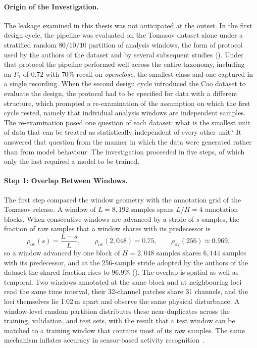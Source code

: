 \paragraph[Origin of the Investigation]{Origin of the Investigation.}
The leakage examined in this thesis was not anticipated at the outset. In the first design cycle, the pipeline was evaluated on the Tomasov dataset alone under a stratified random $80/10/10$ partition of analysis windows, the form of protocol used by the authors of the dataset and by several subsequent studies (). Under that protocol the pipeline performed well across the entire taxonomy, including an $F_1$ of $0.72$ with $70\%$ recall on \emph{openclose}, the smallest class and one captured in a single recording. When the second design cycle introduced the Cao dataset to evaluate the design, the protocol had to be specified for data with a different structure, which prompted a re-examination of the assumption on which the first cycle rested, namely that individual analysis windows are independent samples. The re-examination posed one question of each dataset: what is the smallest unit of data that can be treated as statistically independent of every other unit? It answered that question from the manner in which the data were generated rather than from model behaviour. The investigation proceeded in five steps, of which only the last required a model to be trained.

\paragraph[Step 1: Overlap Between Windows]{Step 1: Overlap Between Windows.}
The first step compared the window geometry with the annotation grid of the Tomasov release. A window of $L = 8{,}192$ samples spans $L/H = 4$ annotation blocks. When consecutive windows are advanced by a stride of $s$ samples, the fraction of raw samples that a window shares with its predecessor is
\begin{equation}
	\rho_{\mathrm{ov}}(s) = \frac{L - s}{L}, \qquad \rho_{\mathrm{ov}}(2{,}048) = 0.75, \qquad \rho_{\mathrm{ov}}(256) \approx 0.969,
	\label{eq:overlap}
\end{equation}
so a window advanced by one block of $H = 2{,}048$ samples shares $6{,}144$ samples with its predecessor, and at the 256-sample stride adopted by the authors of the dataset the shared fraction rises to $96.9\%$ (). The overlap is spatial as well as temporal. Two windows annotated at the same block and at neighbouring loci read the same time interval, their 32-channel patches share 31 channels, and the loci themselves lie 1.02\,m apart and observe the same physical disturbance. A window-level random partition distributes these near-duplicates across the training, validation, and test sets, with the result that a test window can be matched to a training window that contains most of its raw samples. The same mechanism inflates accuracy in sensor-based activity recognition~\cite{dehghani2019windows}.

